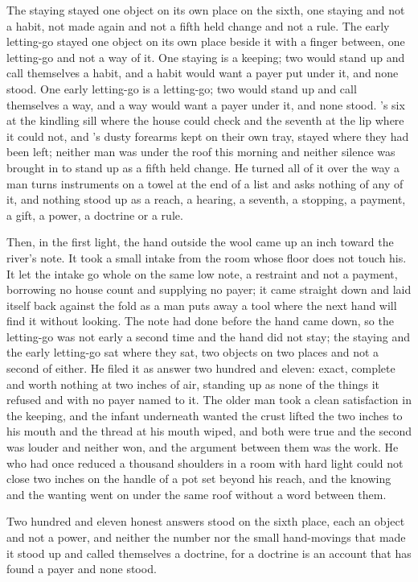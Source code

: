 The staying stayed one object on its own place on the sixth, one staying and not a habit, not made again and not a fifth held change and not a rule. The early letting-go stayed one object on its own place beside it with a finger between, one letting-go and not a way of it. One staying is a keeping; two would stand up and call themselves a habit, and a habit would want a payer put under it, and none stood. One early letting-go is a letting-go; two would stand up and call themselves a way, and a way would want a payer under it, and none stood. 's six at the kindling sill where the house could check and the seventh at the lip where it could not, and 's dusty forearms kept on their own tray, stayed where they had been left; neither man was under the roof this morning and neither silence was brought in to stand up as a fifth held change. He turned all of it over the way a man turns instruments on a towel at the end of a list and asks nothing of any of it, and nothing stood up as a reach, a hearing, a seventh, a stopping, a payment, a gift, a power, a doctrine or a rule.

\scenebreak

Then, in the first light, the hand outside the wool came up an inch toward the river's note. It took a small intake from the room whose floor does not touch his. It let the intake go whole on the same low note, a restraint and not a payment, borrowing no house count and supplying no payer; it came straight down and laid itself back against the fold as a man puts away a tool where the next hand will find it without looking. The note had done before the hand came down, so the letting-go was not early a second time and the hand did not stay; the staying and the early letting-go sat where they sat, two objects on two places and not a second of either. He filed it as answer two hundred and eleven: exact, complete and worth nothing at two inches of air, standing up as none of the things it refused and with no payer named to it. The older man took a clean satisfaction in the keeping, and the infant underneath wanted the crust lifted the two inches to his mouth and the thread at his mouth wiped, and both were true and the second was louder and neither won, and the argument between them was the work. He who had once reduced a thousand shoulders in a room with hard light could not close two inches on the handle of a pot set beyond his reach, and the knowing and the wanting went on under the same roof without a word between them.

Two hundred and eleven honest answers stood on the sixth place, each an object and not a power, and neither the number nor the small hand-movings that made it stood up and called themselves a doctrine, for a doctrine is an account that has found a payer and none stood.

